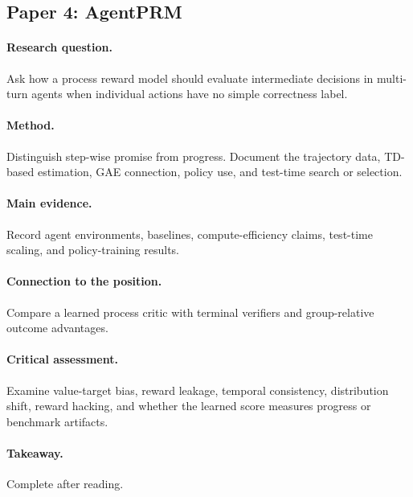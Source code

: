 \subsection{Paper 4: AgentPRM \citep{xi2025agentprm}}
\paragraph{Research question.} Ask how a process reward model should evaluate intermediate decisions in multi-turn agents when individual actions have no simple correctness label.
\paragraph{Method.} Distinguish step-wise promise from progress. Document the trajectory data, TD-based estimation, GAE connection, policy use, and test-time search or selection.
\paragraph{Main evidence.} Record agent environments, baselines, compute-efficiency claims, test-time scaling, and policy-training results.
\paragraph{Connection to the position.} Compare a learned process critic with terminal verifiers and group-relative outcome advantages.
\paragraph{Critical assessment.} Examine value-target bias, reward leakage, temporal consistency, distribution shift, reward hacking, and whether the learned score measures progress or benchmark artifacts.
\paragraph{Takeaway.} Complete after reading.
